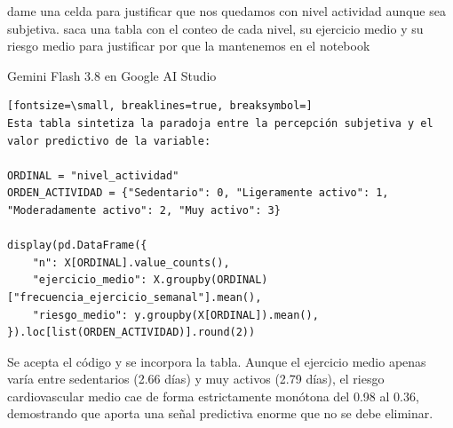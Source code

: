\documentclass[12pt,a4paper,oneside]{book}
\begin{document}
\begin{iaprompt}
dame una celda para justificar que nos quedamos con nivel actividad aunque sea subjetiva.  saca una tabla con el conteo de cada nivel, su ejercicio medio y su riesgo medio para justificar por que la mantenemos en el notebook
\end{iaprompt}
\begin{iaresp}{Gemini Flash 3.8 en Google AI Studio}
\begin{Verbatim}[fontsize=\small, breaklines=true, breaksymbol=]
Esta tabla sintetiza la paradoja entre la percepción subjetiva y el valor predictivo de la variable:

ORDINAL = "nivel_actividad"
ORDEN_ACTIVIDAD = {"Sedentario": 0, "Ligeramente activo": 1, "Moderadamente activo": 2, "Muy activo": 3}

display(pd.DataFrame({
    "n": X[ORDINAL].value_counts(),
    "ejercicio_medio": X.groupby(ORDINAL)["frecuencia_ejercicio_semanal"].mean(),
    "riesgo_medio": y.groupby(X[ORDINAL]).mean(),
}).loc[list(ORDEN_ACTIVIDAD)].round(2))
\end{Verbatim}
\end{iaresp}
\begin{iaanalisis}
Se acepta el código y se incorpora la tabla. Aunque el ejercicio medio apenas varía entre sedentarios (2.66 días) y muy activos (2.79 días), el riesgo cardiovascular medio cae de forma estrictamente monótona del 0.98 al 0.36, demostrando que aporta una señal predictiva enorme que no se debe eliminar.
\end{iaanalisis}
\end{document}
